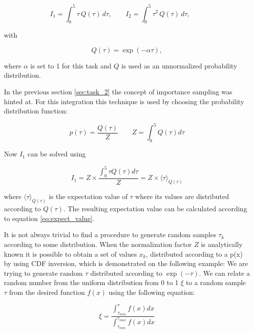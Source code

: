 \documentclass[a4paper, 11pt]{article}          %
\begin{document}
    \begin{equation}\label{eq:ints_to_calc}
        I_1 = \int_0^5 \tau \, Q(\tau) \, d\tau, \qquad
        I_2 = \int_0^5 \tau^2 \, Q(\tau) \, d\tau, \qquad
    \end{equation}

    with

    \begin{equation}
        \label{eq:Q}
        Q(\tau) = \exp(-\alpha\tau),
    \end{equation}

    where $\alpha$ is set to 1 for this task and $Q$ is used as an unnormalized probability distribution.

    In the previous section \ref{sec:task_2} the concept of importance sampling was hinted at. For this integration this technique is used by choosing the probability distribution function:

    \begin{equation*}
        p(\tau) = \frac{Q(\tau)}{Z} \qquad Z = \int_0^5 Q(\tau) d\tau
    \end{equation*}

    Now $I_1$ can be solved using

    \begin{equation}\label{eq:task3_integrals}
        I_1 = Z \times \frac{\int_0^5 \tau Q(\tau) d\tau}{Z} = Z \times \langle \tau \rangle_{Q(\tau)}
    \end{equation}

    where $\langle \tau \rangle_{Q(\tau)}$ is the expectation value of $\tau$ where its values are distributed according to $Q(\tau)$. The resulting expectation value can be calculated according to equation \eqref{eq:expect_value}.

    It is not always trivial to find a procedure to generate random samples $\tau_k$ according to some distribution. When the normalization factor $Z$ is analytically known it is possible to obtain a set of values $x_k$, distributed according to a p(x) by using CDF inversion, which is demonstrated on the following example: We are trying to generate random $\tau$ distributed according to $\exp(-\tau)$. We can relate a random number from the uniform distribution from 0 to 1 $\xi$ to a random sample $\tau$ from the desired function $f(x)$ using the following equation:

    \begin{equation}\label{eq:cdf-inversion}
        \xi = \frac{\int_{\tau_{min}}^{\tau} f(x) dx}{\int_{\tau_{min}}^{\tau_{max}} f(x) dx}
    \end{equation}
\end{document}
